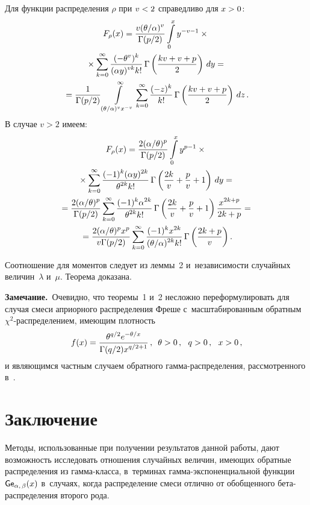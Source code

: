 \begin{multicols}{2}
Для функции распределения $\rho$ при $v\hm<2$ справедливо для $x\hm>0$:
\begin{multline*}
F_\rho(x)  =\fr{v(\theta/\alpha)^{v}}{ \Gamma(p/2)}\int\limits_{0}^{x}  y^{-v-1}\times{}
\\
{}\times
\sum\limits_{k=0}^{\infty}\fr{(-\theta^{v})^k}{(\alpha y)^{vk} k!} \,
\Gamma\left(\fr{kv + v+p}{2}\right)
\, dy={}\\
{}=\fr{1 }{\Gamma(p/2)}\int\limits_{(\theta/\alpha)^{v}x^{-v}}^\infty 
\sum\limits_{k=0}^\infty \fr{(-z)^k}{k!}\,\Gamma\left(\fr{kv+v+p}{2}\right) \, dz\,.
\end{multline*}
В случае $v>2$ имеем:
\begin{multline*}
F_\rho(x) =\fr{2(\alpha/\theta)^p}{\Gamma(p/2)}\int\limits_{0}^{x} y^{p-1}\times{}\\
{}\times
\sum\limits_{k=0}^{\infty}\fr{(-1)^k (\alpha y)^{2k}}{\theta^{2k}k!} \,
\Gamma\left(\fr{2k}{v} +\fr{p}{v}+1\right)
\, dy={}\\
{}=\fr{2(\alpha/\theta)^{p} }{\Gamma(p/2)}\sum\limits_{k=0}^\infty 
\fr{(-
1)^k\alpha^{ 2k}}{\theta^{ 2k}k!}\,\Gamma\left(\fr{2k}{v}+\fr{p}{v}+1\right) 
\fr{ x^{ 2k+p}}{ 2k+ p}={}\\
{}=\fr{2(\alpha/\theta)^{p}x^{p} }{v\Gamma(p/2)}\sum_{k=0}^\infty 
\fr{(-1)^kx^{ 2k}}{(\theta/\alpha)^{ 2k}k!}\,\Gamma\left(\fr{2k+p}{v}\right).
\end{multline*}

Соотношение для моментов следует из леммы~2 и~независимости случайных величин~$\lambda$ 
и~$\mu$.
Теорема доказана.

\smallskip

\noindent
\textbf{Замечание.}\ Очевидно, что теоремы~1 и~2 несложно переформулировать для 
случая смеси априорного распределения Фреше с~масштабированным обратным 
$\chi^2$-рас\-пре\-де\-ле\-ни\-ем, име\-ющим плотность
$$
f(x)=\fr{\theta^{q/2} e^{-\theta/x}}{\Gamma({q}/{2})x^{q/2 +1}}\,,\enskip 
\theta>0\,,\ \ q>0\,,\ \ x>0\,,
$$
и являющимся частным случаем обратного гамма-рас\-пре\-де\-ле\-ния, рассмотренного 
в~\cite{KuPaSh2018}.


\section{Заключение}

Методы, использованные при получении результатов данной работы, дают возможность 
исследовать отношения случайных величин, имеющих обратные распределения из 
гам\-ма-клас\-са, в~терминах гам\-ма-экс\-по\-нен\-ци\-аль\-ной 
функции~${\sf Ge}_{\alpha,\, \beta} 
(x)$ в~случаях, когда распределение смеси отлично от обобщенного бе\-та-рас\-пре\-де\-ле\-ния 
второго рода.


\end{multicols}

